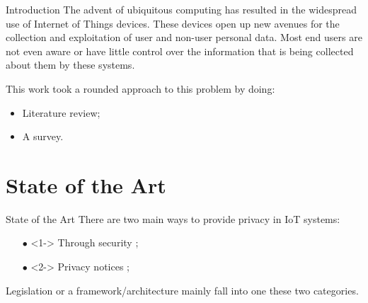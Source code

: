 \documentclass[xcolor={svgnames},compress,aspectratio=169]{beamer}
\begin{document}

\begin{frame}{Introduction}
    The advent of ubiquitous computing has resulted in the widespread use of
    Internet of Things devices. These devices open up
    new avenues for the collection and exploitation of user and non-user personal
    data. Most end users are not even aware or have little control over the
    information that is being collected about them by these systems.

    This work took a rounded approach to this problem by doing:
    \begin{itemize}
        \item<1-> Literature review;
        \item<2-> A survey.
    \end{itemize}
\end{frame}


\section{State of the Art}

\begin{frame}{State of the Art}
    \vspace*{\fill}
    There are two main ways to provide privacy in IoT systems:
    \vspace*{\fill}
    \begin{itemize}
        \item[$\bullet$]<1->
        Through security \cite{weber2015internet, fabiano2017internet};
        \item[$\bullet$]<2->
        Privacy notices \cite{colnago2020informing, feng2021design, das2018personalized};
    \end{itemize}
    \vspace*{\fill}
    Legislation or a framework/architecture mainly fall into one these two categories.
    \vspace*{\fill}
\end{frame}
\end{document}
